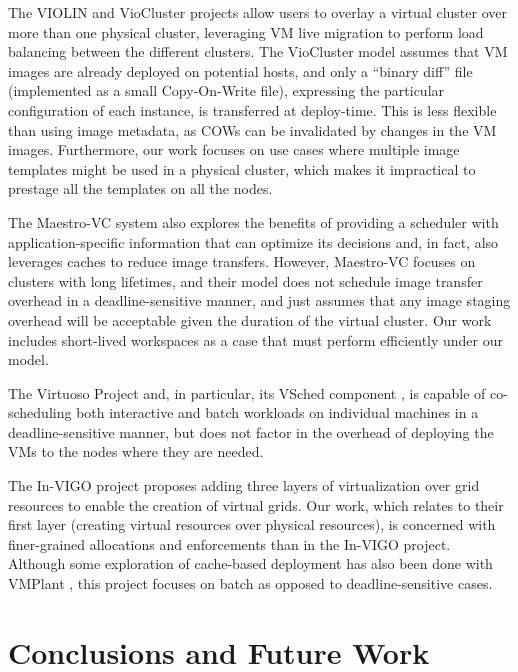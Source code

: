 \documentclass[singlespace]{ccw_chithesis}
\begin{document}
The VIOLIN and VioCluster projects \cite{BorjaCite13, viocluster, DBLP:journals/computer/RuthJXG05} allow users to overlay a
virtual cluster over more than one physical cluster, leveraging VM live
migration to perform load balancing between the different clusters. The
VioCluster model assumes that VM images are already deployed on
potential hosts, and only a ``binary diff'' file (implemented as a
small Copy{}-On{}-Write file), expressing the particular configuration
of each instance, is transferred at deploy{}-time. This is less
flexible than using image metadata, as COWs can be invalidated by
changes in the VM images. Furthermore, our work focuses on use cases
where multiple image templates might be used in a physical cluster,
which makes it impractical to prestage all the templates on all the
nodes.

The Maestro{}-VC system \cite{BorjaCite18} also explores the benefits of providing a
scheduler with application{}-specific information that can optimize its
decisions and, in fact, also leverages caches to reduce image
transfers. However, Maestro{}-VC focuses on clusters with long
lifetimes, and their model does not schedule image transfer overhead in
a deadline{}-sensitive manner, and just assumes that any image staging
overhead will be acceptable given the duration of the virtual cluster.
Our work includes short{}-lived workspaces as a case that must perform
efficiently under our model.

The Virtuoso Project \cite{BorjaCite19} and, in particular, its VSched component \cite{BorjaCite17},
is capable of co{}-scheduling both interactive and batch workloads on
individual machines in a deadline{}-sensitive manner, but does not
factor in the overhead of deploying the VMs to the nodes where they are
needed.

The In{}-VIGO project \cite{BorjaCite16} proposes adding three layers of
virtualization over grid resources to enable the creation of virtual
grids. Our work, which relates to their first layer (creating virtual
resources over physical resources), is concerned with finer{}-grained
allocations and enforcements than in the In{}-VIGO project. Although some exploration of cache-based deployment has also been done with VMPlant \cite{BorjaCite20}, this project focuses on batch as opposed to deadline-sensitive cases.

\chapter{Conclusions and Future Work}
\label{cha:conclusions}
\end{document}
